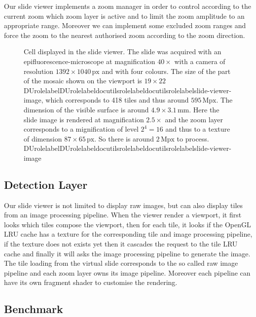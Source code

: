 \documentclass[letterpaper,compsoc,twoside]{IEEEtran}
\providecommand*{\DUrole}[2]{\ifcsname DUrole#1\endcsname \csname DUrole#1\endcsname{#2}\else \ifcsname docutilsrole#1\endcsname \csname docutilsrole#1\endcsname{#2}\else #2\fi \fi }
\begin{document}
Our slide viewer implements a zoom manager in order to control according to the current zoom which
zoom layer is active and to limit the zoom amplitude to an appropriate range. Moreover we can
implement some excluded zoom ranges and force the zoom to the nearest authorised zoom according to
the zoom direction.\begin{figure}[t]\noindent{}
\caption{Cell displayed in the slide viewer. The slide was acquired with an epifluorescence-microscope at
magnification $40\times$ with a camera of resolution $1392 \times 1040\,\text{px}$
and with four colours. The size of the part of the mosaic shown on the viewport is $19
\times 22$ \DUrole{label}{slide-viewer-image}, which corresponds to 418 tiles and thus around
$595\,\text{Mpx}$. The dimension of the visible surface is around $4.9 \times
3.1\,\text{mm}$. Here the slide image is rendered at magnification $2.5\times$ and the zoom
layer corresponds to a mignification of level $2^4 = 16$ and thus to a texture of dimension
$87 \times 65\,\text{px}$. So there is around $2\,\text{Mpx}$ to
process. \DUrole{label}{slide-viewer-image}}
\end{figure}





\subsection{Detection Layer\label{detection-layer}}


Our slide viewer is not limited to display raw images, but can also display tiles from an image
processing pipeline. When the viewer render a viewport, it first looks which tiles compose the
viewport, then for each tile, it looks if the OpenGL LRU cache has a texture for the corresponding
tile and image processing pipeline, if the texture does not exists yet then it cascades the request
to the tile LRU cache and finally it will asks the image processing pipeline to generate the
image. The tile loading from the virtual slide corresponds to the so called raw image pipeline and
each zoom layer owns its image pipeline. Moreover each pipeline can have its own fragment shader
to customise the rendering.

\subsection{Benchmark\label{benchmark}}
\end{document}
